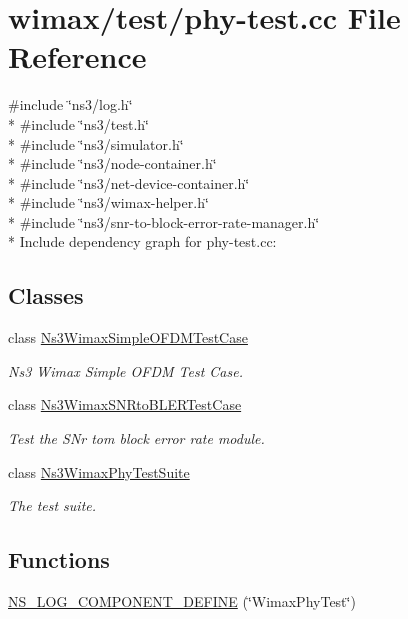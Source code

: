 \hypertarget{phy-test_8cc}{}\section{wimax/test/phy-\/test.cc File Reference}
\label{phy-test_8cc}
{\ttfamily \#include \char`\"{}ns3/log.\+h\char`\"{}}\\*
{\ttfamily \#include \char`\"{}ns3/test.\+h\char`\"{}}\\*
{\ttfamily \#include \char`\"{}ns3/simulator.\+h\char`\"{}}\\*
{\ttfamily \#include \char`\"{}ns3/node-\/container.\+h\char`\"{}}\\*
{\ttfamily \#include \char`\"{}ns3/net-\/device-\/container.\+h\char`\"{}}\\*
{\ttfamily \#include \char`\"{}ns3/wimax-\/helper.\+h\char`\"{}}\\*
{\ttfamily \#include \char`\"{}ns3/snr-\/to-\/block-\/error-\/rate-\/manager.\+h\char`\"{}}\\*
Include dependency graph for phy-\/test.cc\+:
\subsection*{Classes}
\begin{DoxyCompactItemize}
\item 
class \hyperlink{classNs3WimaxSimpleOFDMTestCase}{Ns3\+Wimax\+Simple\+O\+F\+D\+M\+Test\+Case}
\begin{DoxyCompactList}\small\item\em Ns3 Wimax Simple O\+F\+DM Test Case. \end{DoxyCompactList}\item 
class \hyperlink{classNs3WimaxSNRtoBLERTestCase}{Ns3\+Wimax\+S\+N\+Rto\+B\+L\+E\+R\+Test\+Case}
\begin{DoxyCompactList}\small\item\em Test the S\+Nr tom block error rate module. \end{DoxyCompactList}\item 
class \hyperlink{classNs3WimaxPhyTestSuite}{Ns3\+Wimax\+Phy\+Test\+Suite}
\begin{DoxyCompactList}\small\item\em The test suite. \end{DoxyCompactList}\end{DoxyCompactItemize}
\subsection*{Functions}
\begin{DoxyCompactItemize}
\item 
\hyperlink{phy-test_8cc_a7ffb4802e8d321974237f2aeeb23b7d7}{N\+S\+\_\+\+L\+O\+G\+\_\+\+C\+O\+M\+P\+O\+N\+E\+N\+T\+\_\+\+D\+E\+F\+I\+NE} (\char`\"{}Wimax\+Phy\+Test\char`\"{})
\end{DoxyCompactItemize}

